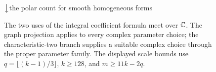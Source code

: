 \begin{figure}[tbp]
\smallskip
$\big\downarrow$\quad the polar count for smooth homogeneous forms
\smallskip

\caption{The two uses of the integral coefficient formula meet over
$\mathbb C$. The graph projection applies to every complex parameter choice;
the characteristic-two branch supplies a suitable complex choice through
the proper parameter family. The displayed scale bounds use
$q=\lfloor(k-1)/3\rfloor$, $k\ge128$, and $m\ge11k-2q$.}
\label{fig:proof-flow}
\end{figure}
